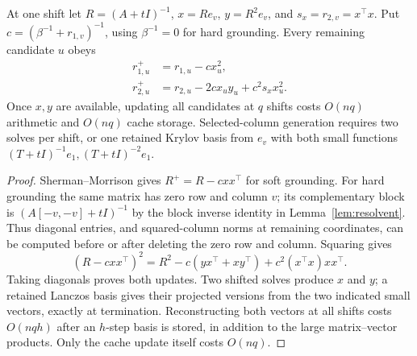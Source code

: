\begin{proposition}\label{prop:updates}
At one shift let $R=(A+tI)^{-1}$, $x=Re_v$, $y=R^2e_v$, and
$s_x=r_{2,v}=x^\top x$. Put $c=(\beta^{-1}+r_{1,v})^{-1}$, using
$\beta^{-1}=0$ for hard grounding. Every remaining candidate $u$ obeys
\begin{align}
 r_{1,u}^+&=r_{1,u}-c x_u^2,\label{eq:updateone}\\
 r_{2,u}^+&=r_{2,u}-2c x_u y_u+c^2 s_x x_u^2.\label{eq:updatetwo}
\end{align}
Once $x,y$ are available, updating all candidates at $q$ shifts costs
$O(nq)$ arithmetic and $O(nq)$ cache storage. Selected-column generation
requires two solves per shift, or one retained Krylov basis from $e_v$
with both small functions $(T+tI)^{-1}e_1,(T+tI)^{-2}e_1$.
\end{proposition}
\begin{proof}
Sherman--Morrison gives $R^+=R-cxx^\top$ for soft grounding.
For hard grounding the same matrix has zero row and column $v$;
its complementary block is $(A[-v,-v]+tI)^{-1}$ by the block inverse
identity in Lemma~\ref{lem:resolvent}. Thus diagonal entries, and
squared-column norms at remaining coordinates, can be computed before
or after deleting the zero row and column. Squaring gives
\[
 (R-cxx^\top)^2=R^2-c(yx^\top+xy^\top)+c^2(x^\top x)xx^\top.
\]
Taking diagonals proves both updates. Two shifted solves produce
$x$ and $y$; a retained Lanczos basis gives their projected versions
from the two indicated small vectors, exactly at termination.
Reconstructing both vectors at all shifts costs $O(nqh)$ after an
$h$-step basis is stored, in addition to the large matrix--vector
products. Only the cache update itself costs $O(nq)$.
\end{proof}



